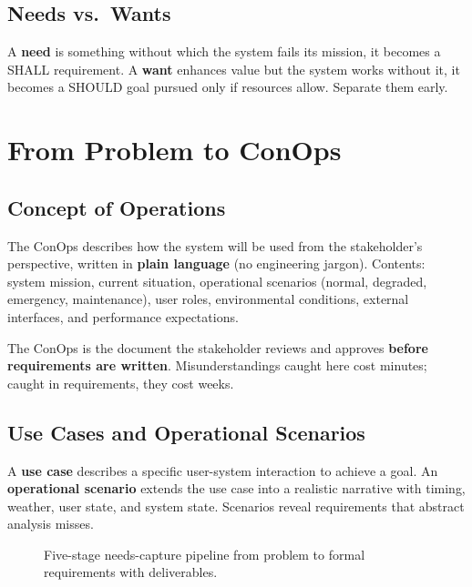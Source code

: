\subsection{Needs vs.\ Wants}
A \textbf{need} is something without which the system fails its mission, it becomes a SHALL requirement. A \textbf{want} enhances value but the system works without it, it becomes a SHOULD goal pursued only if resources allow. Separate them early.

\section{From Problem to ConOps}
\subsection{Concept of Operations}
The ConOps describes how the system will be used from the stakeholder's perspective, written in \textbf{plain language} (no engineering jargon). Contents: system mission, current situation, operational scenarios (normal, degraded, emergency, maintenance), user roles, environmental conditions, external interfaces, and performance expectations.

The ConOps is the document the stakeholder reviews and approves \textbf{before requirements are written}. Misunderstandings caught here cost minutes; caught in requirements, they cost weeks.

\subsection{Use Cases and Operational Scenarios}
A \textbf{use case} describes a specific user-system interaction to achieve a goal. An \textbf{operational scenario} extends the use case into a realistic narrative with timing, weather, user state, and system state. Scenarios reveal requirements that abstract analysis misses.

\begin{figure}[htbp]\centering

\caption{Five-stage needs-capture pipeline from problem to formal requirements with deliverables.}\label{fig:pipe}
\end{figure}


